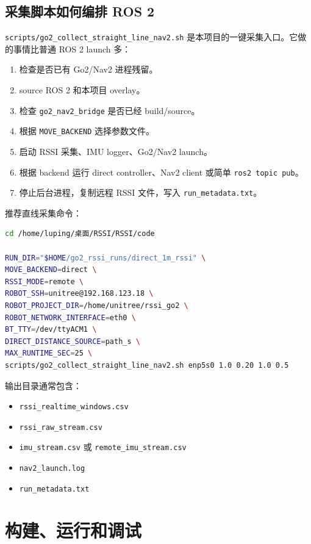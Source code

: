 \documentclass[UTF8,11pt,a4paper,openany]{ctexrep}
\newcommand{\code}[1]{\nolinkurl{#1}}
\newcommand{\file}[1]{\nolinkurl{#1}}
\newcommand{\pkg}[1]{\nolinkurl{#1}}
\newcommand{\param}[1]{\nolinkurl{#1}}
\begin{document}
\section{采集脚本如何编排 ROS 2}

\file{scripts/go2_collect_straight_line_nav2.sh} 是本项目的一键采集入口。它做的事情比普通 ROS 2 launch 多：

\begin{enumerate}
  \item 检查是否已有 Go2/Nav2 进程残留。
  \item source ROS 2 和本项目 overlay。
  \item 检查 \pkg{go2_nav2_bridge} 是否已经 build/source。
  \item 根据 \param{MOVE_BACKEND} 选择参数文件。
  \item 启动 RSSI 采集、IMU logger、Go2/Nav2 launch。
  \item 根据 backend 运行 direct controller、Nav2 client 或简单 \code{ros2 topic pub}。
  \item 停止后台进程，复制远程 RSSI 文件，写入 \file{run_metadata.txt}。
\end{enumerate}

推荐直线采集命令：

\begin{lstlisting}[language=bash]
cd /home/luping/桌面/RSSI/RSSI/code

RUN_DIR="$HOME/go2_rssi_runs/direct_1m_rssi" \
MOVE_BACKEND=direct \
RSSI_MODE=remote \
ROBOT_SSH=unitree@192.168.123.18 \
ROBOT_PROJECT_DIR=/home/unitree/rssi_go2 \
ROBOT_NETWORK_INTERFACE=eth0 \
BT_TTY=/dev/ttyACM1 \
DIRECT_DISTANCE_SOURCE=path_s \
MAX_RUNTIME_SEC=25 \
scripts/go2_collect_straight_line_nav2.sh enp5s0 1.0 0.20 1.0 0.5
\end{lstlisting}

输出目录通常包含：

\begin{itemize}
  \item \file{rssi_realtime_windows.csv}
  \item \file{rssi_raw_stream.csv}
  \item \file{imu_stream.csv} 或 \file{remote_imu_stream.csv}
  \item \file{nav2_launch.log}
  \item \file{run_metadata.txt}
\end{itemize}

\chapter{构建、运行和调试}
\label{chap:run-debug}
\end{document}
